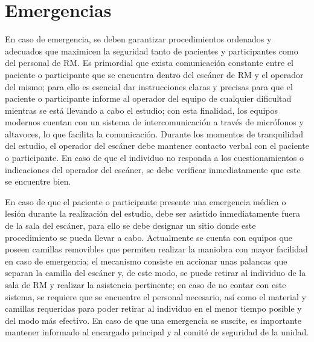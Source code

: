 \section{Emergencias}
En caso de emergencia, se deben garantizar procedimientos ordenados y adecuados que maximicen la seguridad tanto de pacientes y participantes como del personal de RM. Es primordial que exista comunicación constante entre el paciente o participante que se encuentra dentro del escáner de RM y el operador del mismo; para ello es esencial dar instrucciones claras y precisas para que el paciente o participante informe al operador del equipo de cualquier dificultad mientras se está llevando a cabo el estudio; con esta finalidad, los equipos modernos cuentan con un sistema de intercomunicación a través de micrófonos y altavoces, lo que facilita la comunicación. Durante los momentos de tranquilidad del estudio, el operador del escáner debe mantener contacto verbal con el paciente o participante. En caso de que el individuo no responda a los cuestionamientos o indicaciones del operador del escáner, se debe verificar inmediatamente que este se encuentre bien. 

En caso de que el paciente o participante presente una emergencia médica o lesión durante la realización del estudio, debe ser asistido inmediatamente fuera de la sala del escáner, para ello se debe designar un sitio donde este procedimiento se pueda llevar a cabo. Actualmente se cuenta con equipos que poseen camillas removibles que permiten realizar la maniobra con mayor facilidad en caso de emergencia; el mecanismo consiste en accionar unas palancas que separan la camilla del escáner y, de este modo, se puede retirar al individuo de la sala de RM y realizar la asistencia pertinente; en caso de no contar con este sistema, se requiere que se encuentre el personal necesario, así como el material y camillas requeridas para poder retirar al individuo en el menor tiempo posible y del modo más efectivo. En caso de que una emergencia se suscite, es importante mantener informado al encargado principal y al comité de seguridad de la unidad.

